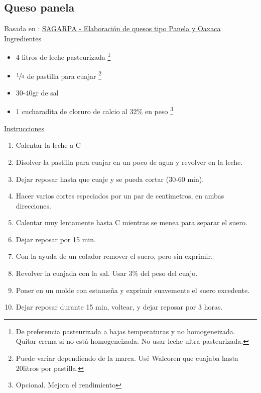 \subsection{Queso panela}

Basada en : \href{http://www.sagarpa.gob.mx/desarrolloRural/Documents/fichasaapt/Elaboraci%C3%B3n%20de%20quesos.pdf}{SAGARPA - Elaboración de quesos tipo Panela y Oaxaca} \\

\underline{Ingredientes}
\begin{itemize}
\item 4 litros de leche pasteurizada \footnote{De preferencia pasteurizada a bajas temperaturas y no homogeneizada. Quitar crema si no está homogeneizada. No usar leche ultra-pasteurizada.}
\item $\sfrac{1}{4}$ de pastilla para cuajar \footnote{Puede variar dependiendo de la marca. Usé Walcoren que cuajaba hasta 
\Sim 20litros por pastilla.}
\item 30-40gr de sal
\item 1 cucharadita de cloruro de calcio al 32\% en peso \footnote{Opcional. Mejora el rendimiento}
\end{itemize}


\underline{Instrucciones}
\begin{enumerate}
\item Calentar la leche a  C
\item Disolver la pastilla para cuajar en un poco de agua y revolver en la leche.
\item Dejar reposar hasta que cuaje y se pueda cortar (30-60 min).
\item Hacer varios cortes especiados por un par de centimetros, en ambas direcciones.
\item Calentar muy lentamente hasta  C mientras se menea para separar el suero.
\item Dejar reposar por 15 min.
\item Con la ayuda de un colador remover el suero, pero sin exprimir.
\item Revolver la cuajada con la sal. Usar 3\% del peso del cuajo.
\item Poner en un molde con estame\~na y exprimir suavemente el suero excedente.
\item Dejar reposar durante 15 min, voltear, y dejar reposar por 3 horas.
\end{enumerate}
